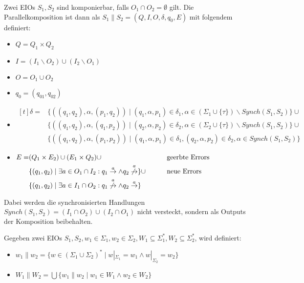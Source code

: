 \begin{Def}[Parallelkomposition]
  Zwei EIOs $S_1, S_2$ sind komponierbar, falls
  $O_1\cap O_2=\emptyset$ gilt. Die Parallelkomposition ist dann als
  $S_1\|S_2=(Q,I,O,\delta ,q_0,E)$ mit folgendem definiert:
  \begin{itemize}
    \item $Q=Q_1\times Q_2$
    \item $I=(I_1\backslash O_2)\cup(I_2\backslash O_1)$
    \item $O=O_1\cup O_2$
    \item $q_0=(q_{01},q_{02})$
    \item $\begin{aligned}[t]
    \delta =&\{((q_1,q_2),\alpha ,(p_1,q_2))\mid (q_1,\alpha ,p_1)\in\delta
      _1,\alpha\in(\Sigma _1\cup\{\tau\})\backslash Synch(S_1,S_2)\}\cup\\
      &\{((q_1,q_2),\alpha ,(q_1,p_2))\mid (q_2,\alpha ,p_2)\in\delta
      _2,\alpha\in(\Sigma _2\cup\{\tau\})\backslash Synch(S_1,S_2)\}\cup\\
      &\{((q_1,q_2),\alpha ,(p_1,p_2))\mid (q_1,\alpha ,p_1)\in\delta
      _1, (q_2,\alpha ,p_2)\in\delta _2, \alpha\in Synch(S_1,S_2)\}
  \end{aligned}$
    \item $\begin{aligned}[t]
        E=&(Q_1\times E_2)\cup (E_1\times Q_2)\cup
        &&\phantom{neue}\mathrm{geerbte}~\mathrm{Errors}\\
      &\{(q_1,q_2)\mid \exists a\in O_1\cap I_2: q_1\overset{a}{\rightarrow}\wedge
      q_2\overset{a}{\not{\hspace{-0.1cm}\rightarrow}}\}\cup
      &&\phantom{neue}\mathrm{neue}~\mathrm{Errors}\\
  &\{(q_1,q_2)\mid \exists a\in I_1\cap O_2:
q_1\overset{a}{\not{\hspace{-0.1cm}\rightarrow}}\wedge
q_2\overset{a}{\rightarrow}\}
  \end{aligned}$
  \end{itemize}
  Dabei werden die synchronisierten Handlungen $Synch(S_1,
  S_2)=(I_1\cap O_2)\cup(I_2\cap O_1)$ nicht versteckt, sondern als Outputs der
  Komposition beibehalten.
\end{Def}

\begin{Def}
  Gegeben zwei EIOs $S_1, S_2,
  w_1\in\Sigma _1, w_2\in\Sigma _2, W_1\subseteq\Sigma _1^*, W_2\subseteq\Sigma
  _2^*$, wird definiert:
  \begin{itemize}
    \item $w_1\| w_2=\{w\in (\Sigma _1\cup\Sigma _2)^*\mid w|_{\Sigma _1}=w_1\wedge
      w|_{\Sigma _2}=w_2\}$
    \item $W_1\| W_2=\bigcup\{w_1\| w_2\mid w_1\in W_1\wedge w_2\in W_2\}$
  \end{itemize}
\end{Def}

